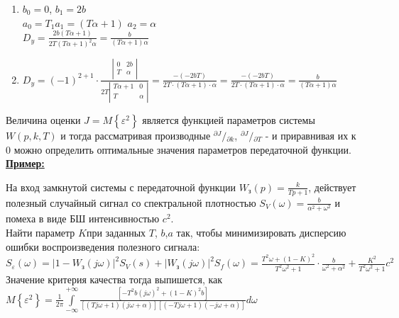 \documentclass[preprint,russian,a5paper,10pt,twoside,mediummath]{ncc}
\newcommand{\ExampleMy}{\vspace{\baselineskip}\textbf{\underline{Пример:}}\nopagebreak\par}
\begin{document}
\begin{enumerate}
\item ${{b}_{0}}=0$, ${{b}_{1}}=2b$
\\${{a}_{0}}={{T}_{1}}{{a}_{1}}=\left( T\alpha +1 \right)$ ${{a}_{2}}=\alpha $
\\${{D}_{y}}=\frac{2b\left( T\alpha +1 \right)}{2T{{\left( T\alpha +1 \right)}^{2}}\alpha }=\frac{b}{\left( T\alpha +1 \right)\alpha }$
\item ${{D}_{y}}={{\left( -1 \right)}^{2+1}}\cdot \frac{\left| \begin{matrix}
   0 & 2b  \\
   T & \alpha   \\
\end{matrix} \right|}{2T\left| \begin{matrix}
   T\alpha +1 & 0  \\
   T & \alpha   \\
\end{matrix} \right|}=\frac{-\left( -2bT \right)}{2T\cdot \left( T\alpha +1 \right)\cdot \alpha }=\frac{-\left( -2bT \right)}{2T\cdot \left( T\alpha +1 \right)\cdot \alpha }=\frac{b}{\left( T\alpha +1 \right)\alpha }$
\end{enumerate}
\par Величина оценки $J=M\left\{ {{\varepsilon }^{2}} \right\}$ является функцией параметров системы  $W\left( p,k,T \right)$ и тогда рассматривая производные ${}^{\partial J}/{}_{\partial k}$, ${}^{\partial J}/{}_{\partial T}$ - и приравнивая их к 0 можно определить оптимальные значения параметров передаточной функции.
\ExampleMy На вход замкнутой системы с передаточной функции ${{W}_{\textit{з}}}\left( p \right)=\frac{k}{Tp+1}$, действует полезный случайный сигнал со спектральной плотностью ${{S}_{V}}\left( \omega  \right)=\frac{b}{{{\alpha }^{2}}+{{\omega }^{2}}}$ и помеха в виде БШ интенсивностью ${{c}^{2}}$. 
\\Найти параметр $K$при заданных $T$, $b$,$a$ так, чтобы минимизировать дисперсию ошибки воспроизведения полезного сигнала:
\\${{S}_{\varepsilon }}\left( \omega  \right)={{\left| 1-{{W}_{\textit{з}}}\left( j\omega  \right) \right|}^{2}}{{S}_{V}}\left( s \right)+{{\left| {{W}_{\textit{з}}}\left( j\omega  \right) \right|}^{2}}{{S}_{f}}\left( \omega  \right)=\frac{{{T}^{2}}\omega +{{\left( 1-K \right)}^{2}}}{{{T}^{2}}{{\omega }^{2}}+1}\cdot \frac{b}{{{\omega }^{2}}+{{\alpha }^{2}}}+\frac{{{K}^{2}}}{{{T}^{2}}{{\omega }^{2}}+1}{{c}^{2}}$  
\\Значение критерия качества тогда выпишется, как $M\left\{ {{\varepsilon }^{2}} \right\}=\frac{1}{2\pi }\int\limits_{-\infty }^{+\infty }{\frac{\left[ -{{T}^{2}}b{{\left( j\omega  \right)}^{2}}+{{\left( 1-K \right)}^{2}}b \right]}{\left[ \left( Tj\omega +1 \right)\left( j\omega +\alpha  \right) \right]\left[ \left( -Tj\omega +1 \right)\left( -j\omega +\alpha  \right) \right]}}d\omega $ 
\end{document}
